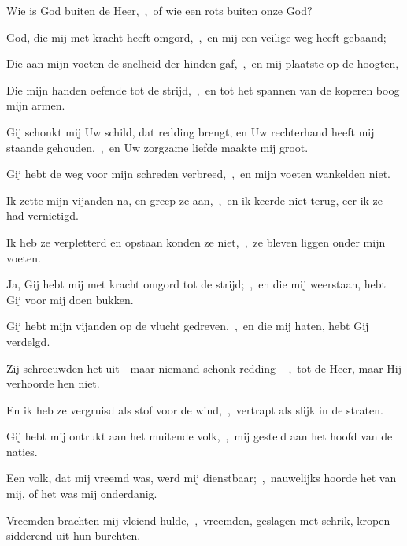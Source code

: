 \documentclass[12pt,twoside,a5paper]{article}
\begin{document}

\begin{halfparskip}
  Wie is God buiten de Heer,~\sep\ of wie een rots buiten onze God?

  God, die mij met kracht heeft omgord,~\sep\ en mij een veilige weg heeft gebaand;

  Die aan mijn voeten de snelheid der hinden gaf,~\sep\ en mij plaatste op de hoogten,

  Die mijn handen oefende tot de strijd,~\sep\ en tot het spannen van de koperen boog mijn armen.
\end{halfparskip}


\begin{halfparskip}
  Gij schonkt mij Uw schild, dat redding brengt, en Uw rechterhand heeft mij staande gehouden,~\sep\ en Uw zorgzame liefde maakte mij groot.

  Gij hebt de weg voor mijn schreden verbreed,~\sep\ en mijn voeten wankelden niet.

  Ik zette mijn vijanden na, en greep ze aan,~\sep\ en ik keerde niet terug, eer ik ze had vernietigd.

  Ik heb ze verpletterd en opstaan konden ze niet,~\sep\ ze bleven liggen onder mijn voeten.

  Ja, Gij hebt mij met kracht omgord tot de strijd;~\sep\ en die mij weerstaan, hebt Gij voor mij doen bukken.

  Gij hebt mijn vijanden op de vlucht gedreven,~\sep\ en die mij haten, hebt Gij verdelgd.

  Zij schreeuwden het uit - maar niemand schonk redding -~\sep\ tot de Heer, maar Hij verhoorde hen niet.

  En ik heb ze vergruisd als stof voor de wind,~\sep\ vertrapt als slijk in de straten.

  Gij hebt mij ontrukt aan het muitende volk,~\sep\ mij gesteld aan het hoofd van de naties.

  Een volk, dat mij vreemd was, werd mij dienstbaar;~\sep\ nauwelijks hoorde het van mij, of het was mij onderdanig.

  Vreemden brachten mij vleiend hulde,~\sep\ vreemden, geslagen met schrik, kropen sidderend uit hun burchten.
\end{halfparskip}

\end{document}
